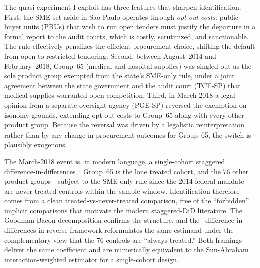 The quasi-experiment I exploit has three features that sharpen identification. First, the SME set-aside in Sao Paulo operates through \emph{opt-out costs}: public buyer units (PBUs) that wish to run open tenders must justify the departure in a formal report to the audit courts, which is costly, scrutinized, and sanctionable. The rule effectively penalizes the efficient procurement choice, shifting the default from open to restricted tendering. Second, between August~2014 and February~2018, Group~65 (medical and hospital supplies) was singled out as the sole product group exempted from the state's SME-only rule, under a joint agreement between the state government and the audit court (TCE-SP) that medical supplies warranted open competition. Third, in March 2018 a legal opinion from a separate oversight agency (PGE-SP) reversed the exemption on isonomy grounds, extending opt-out costs to Group~65 along with every other product group. Because the reversal was driven by a legalistic reinterpretation rather than by any change in procurement outcomes for Group~65, the switch is plausibly exogenous.

The March-2018 event is, in modern language, a single-cohort staggered difference-in-differences~\citep{callaway2021,sun2021,goodmanbacon2021,borusyak2024}: Group~65 is the lone treated cohort, and the 76 other product groups---subject to the SME-only rule since the 2014 federal mandate---are never-treated controls within the sample window. Identification therefore comes from a clean treated-vs-never-treated comparison, free of the ``forbidden'' implicit comparisons that motivate the modern staggered-DiD literature. The Goodman-Bacon decomposition confirms the structure, and the~\citet{kim2019} difference-in-differences-in-reverse framework reformulates the same estimand under the complementary view that the 76 controls are ``always-treated.'' Both framings deliver the same coefficient and are numerically equivalent to the Sun-Abraham interaction-weighted estimator for a single-cohort design.

